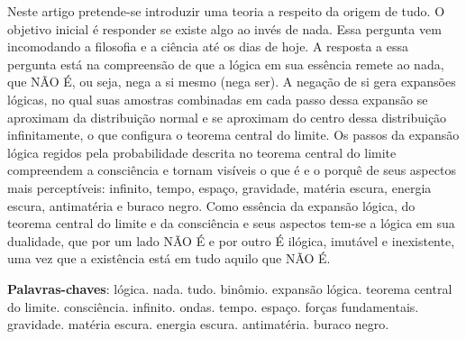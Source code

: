 \vspace{-15mm}
\maketitle
\vspace{-8mm}
\begin{resumoumacoluna}
\vspace{-2mm}
	Neste artigo pretende-se introduzir uma teoria a respeito da origem de tudo. O objetivo inicial é responder se existe algo ao invés de nada. Essa pergunta vem incomodando a filosofia e a ciência até os dias de hoje. A resposta a essa pergunta está na compreensão de que a lógica em sua essência remete ao nada, que NÃO É, ou seja, nega a si mesmo (nega ser). A negação de si gera expansões lógicas, no qual suas amostras combinadas em cada passo dessa expansão se aproximam da distribuição normal e se aproximam do centro dessa distribuição infinitamente, o que configura o teorema central do limite. Os passos da expansão lógica regidos pela probabilidade descrita no teorema central do limite compreendem a consciência e tornam visíveis o que é e o porquê de seus aspectos mais perceptíveis: infinito, tempo, espaço, gravidade, matéria escura, energia escura, antimatéria e buraco negro. Como essência da expansão lógica, do teorema central do limite e da consciência e seus aspectos tem-se a lógica em sua dualidade, que por um lado NÃO É e por outro É ilógica, imutável e inexistente, uma vez que a existência está em tudo aquilo que NÃO É. 
 \vspace{\onelineskip} 
 \noindent
 
 \textbf{Palavras-chaves}: lógica. nada. tudo. binômio. expansão lógica. teorema central do limite. consciência. infinito. ondas. tempo. espaço. forças fundamentais. gravidade. matéria escura. energia escura. antimatéria. buraco negro.
\end{resumoumacoluna}

